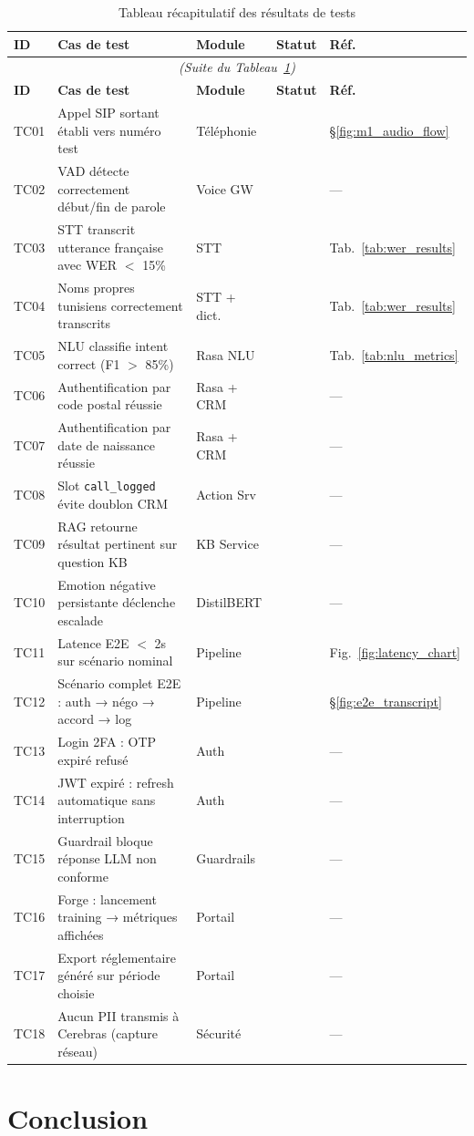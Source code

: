 \begin{longtable}{lp{6cm}lll}
  \caption{Tableau récapitulatif des résultats de tests} \label{tab:test_summary} \\
  \toprule
  \textbf{ID} & \textbf{Cas de test} & \textbf{Module} & \textbf{Statut} & \textbf{Réf.} \\
  \midrule
  \endfirsthead
  \multicolumn{5}{c}{\textit{(Suite du Tableau~\ref{tab:test_summary})}} \\
  \toprule
  \textbf{ID} & \textbf{Cas de test} & \textbf{Module} & \textbf{Statut} & \textbf{Réf.} \\
  \midrule
  \endhead
  \bottomrule
  \endfoot
  TC01 & Appel SIP sortant établi vers numéro test          & Téléphonie & \todo{} & §\ref{fig:m1_audio_flow} \\
  TC02 & VAD détecte correctement début/fin de parole       & Voice GW   & \todo{} & — \\
  TC03 & STT transcrit utterance française avec WER $<$ 15\%& STT        & \todo{} & Tab.~\ref{tab:wer_results} \\
  TC04 & Noms propres tunisiens correctement transcrits      & STT + dict.& \todo{} & Tab.~\ref{tab:wer_results} \\
  TC05 & NLU classifie intent correct (F1 $>$ 85\%)         & Rasa NLU   & \todo{} & Tab.~\ref{tab:nlu_metrics} \\
  TC06 & Authentification par code postal réussie            & Rasa + CRM & \todo{} & — \\
  TC07 & Authentification par date de naissance réussie      & Rasa + CRM & \todo{} & — \\
  TC08 & Slot \texttt{call\_logged} évite doublon CRM        & Action Srv & \todo{} & — \\
  TC09 & RAG retourne résultat pertinent sur question KB     & KB Service & \todo{} & — \\
  TC10 & Emotion négative persistante déclenche escalade     & DistilBERT & \todo{} & — \\
  TC11 & Latence E2E $<$ 2s sur scénario nominal             & Pipeline   & \todo{} & Fig.~\ref{fig:latency_chart} \\
  TC12 & Scénario complet E2E : auth → négo → accord → log  & Pipeline   & \todo{} & §\ref{fig:e2e_transcript} \\
  TC13 & Login 2FA : OTP expiré refusé                       & Auth       & \todo{} & — \\
  TC14 & JWT expiré : refresh automatique sans interruption  & Auth       & \todo{} & — \\
  TC15 & Guardrail bloque réponse LLM non conforme           & Guardrails & \todo{} & — \\
  TC16 & Forge : lancement training → métriques affichées    & Portail    & \todo{} & — \\
  TC17 & Export réglementaire généré sur période choisie     & Portail    & \todo{} & — \\
  TC18 & Aucun PII transmis à Cerebras (capture réseau)      & Sécurité   & \todo{} & — \\
\end{longtable}

\section{Conclusion}

